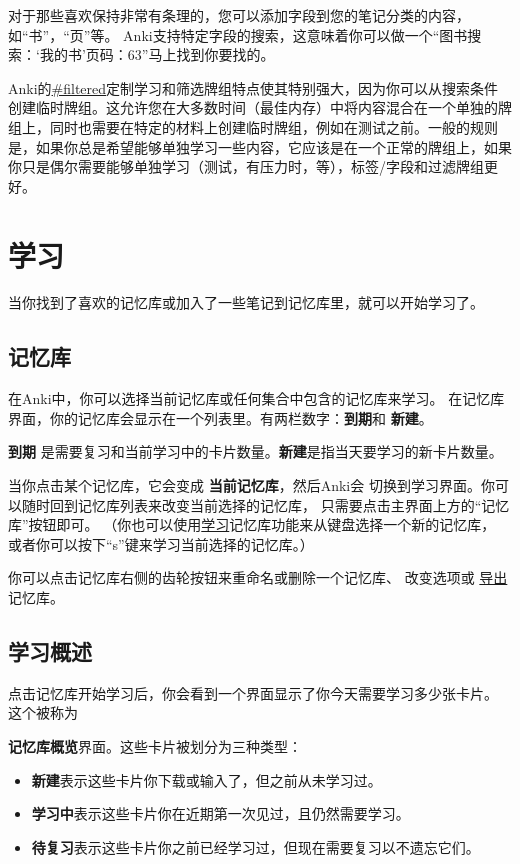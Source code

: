 \documentclass[a4paper]{book}
\begin{document}
	对于那些喜欢保持非常有条理的，您可以添加字段到您的笔记分类的内容，如“书”，“页”等。 Anki支持特定字段的搜索，这意味着你可以做一个“图书搜索：‘我的书’页码：63”马上找到你要找的。
	
	Anki的\url{#filtered}定制学习和筛选牌组特点使其特别强大，因为你可以从搜索条件创建临时牌组。这允许您在大多数时间（最佳内存）中将内容混合在一个单独的牌组上，同时也需要在特定的材料上创建临时牌组，例如在测试之前。一般的规则是，如果你总是希望能够单独学习一些内容，它应该是在一个正常的牌组上，如果你只是偶尔需要能够单独学习（测试，有压力时，等），标签/字段和过滤牌组更好。
	
	\chapter{学习}\label{studydeck}
	
	当你找到了喜欢的记忆库或加入了一些笔记到记忆库里，就可以开始学习了。
	
	\section{记忆库}\label{deckoverview}
	
	在Anki中，你可以选择当前记忆库或任何集合中包含的记忆库来学习。
	在记忆库界面，你的记忆库会显示在一个列表里。有两栏数字：\textbf{到期}和 \textbf{新建}。
	
	\textbf{到期} 是需要复习和当前学习中的卡片数量。\textbf{新建}是指当天要学习的新卡片数量。
	
	当你点击某个记忆库，它会变成 \textbf{当前记忆库}，然后Anki会 切换到学习界面。你可以随时回到记忆库列表来改变当前选择的记忆库， 只需要点击主界面上方的“记忆库”按钮即可。 （你也可以使用\hyperref[studydeck]{学习}记忆库功能来从键盘选择一个新的记忆库， 或者你可以按下“s”键来学习当前选择的记忆库。）
	
	你可以点击记忆库右侧的齿轮按钮来重命名或删除一个记忆库、 改变选项或
	\hyperref[exporting]{导出}记忆库。
	
	\section{学习概述}
	
	点击记忆库开始学习后，你会看到一个界面显示了你今天需要学习多少张卡片。 这个被称为
	
	\textbf{记忆库概览}界面。这些卡片被划分为三种类型：
	
	\begin{itemize}
		\itemsep1pt\parskip0pt
		\item \textbf{新建}表示这些卡片你下载或输入了，但之前从未学习过。
		\item \textbf{学习中}表示这些卡片你在近期第一次见过，且仍然需要学习。
		\item \textbf{待复习}表示这些卡片你之前已经学习过，但现在需要复习以不遗忘它们。
	\end{itemize}
	
\end{document}
